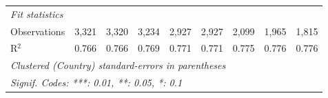 \begin{tabular}{lcccccccc}
   \midrule \emph{Fit statistics}\\
   Observations                                              & 3,321        & 3,320        & 3,234        & 2,927        & 2,927        & 2,099        & 1,965         & 1,815\\  
   R$^2$                                                     & 0.766        & 0.766        & 0.769        & 0.771        & 0.771        & 0.775        & 0.776         & 0.776\\  
   \midrule
   \multicolumn{9}{l}{\emph{Clustered (Country) standard-errors in parentheses}}\\
   \multicolumn{9}{l}{\emph{Signif. Codes: ***: 0.01, **: 0.05, *: 0.1}}\\
\end{tabular}
\par\endgroup


